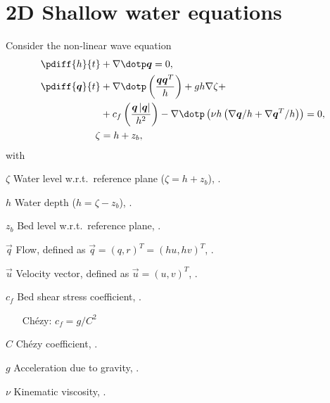 \chapter{2D Shallow water equations}
Consider the non-linear wave equation
\begin{subequations}
    \begin{align}
    \pdiff{h}{t} & + \nabla \dotp \vec{q}  = 0,
    \\
    \pdiff{\vec{q}}{t} & + \nabla \dotp \left( \frac{\vec{q}\vec{q}^T}{h} \right) + gh \nabla \zeta +
    \nonumber \\
    & + c_f \left( \frac{\vec{q}\abs{\vec{q}}}{h^2} \right)
    - \nabla \dotp \left( \nu h \left(  \nabla \vec{q}/h + \nabla \vec{q}^T/h \right) \right) = 0,
    \\
    \zeta & = h + z_b,
\end{align}
\end{subequations}
with
\begin{symbollist}
    \item[$\zeta$] Water level  w.r.t.\ reference plane ($\zeta = h + z_b$), \bunit{\metre}.
    \item[$h$] Water depth ($h = \zeta - z_b$), \bunit{\metre}.
    \item[$z_b$] Bed level  w.r.t.\ reference plane, \bunit{\metre}.
    \item[$\vec{q}$] Flow, defined as $\vec{q} = (q, r)^T = (hu, hv)^T$, \bunit{\square\metre\per\second}.
    \item[$\vec{u}$] Velocity vector, defined as $\vec{u} = (u, v)^T$, \bunit{\metre\per\second}.
    \item[$c_f$] Bed shear stress coefficient, \bunit{-}.
    \begin{itemize}
        \item[Ch\'ezy:] $c_f = g/C^2$
    \end{itemize}
    \item[$C$] Ch\'ezy coefficient, .

    \item[$g$] Acceleration due to gravity, \bunit{\metre\per\square\second}.
    \item[$\nu$] Kinematic viscosity, \bunit{\square\metre\per\second}.
\end{symbollist}
